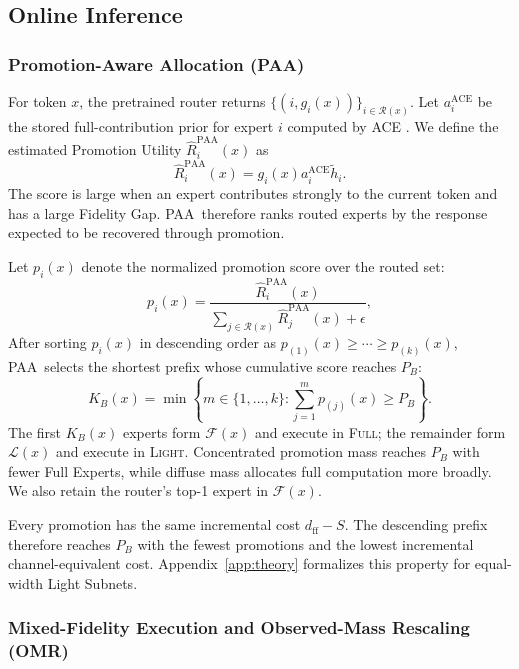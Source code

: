 \documentclass{article}
\newcommand{\Full}{\textsc{Full}}
\newcommand{\Light}{\textsc{Light}}
\newcommand{\PAA}{\textsc{PAA}}
\newcommand{\OMR}{\textsc{OMR}}
\newcommand{\Rset}{\mathcal{R}}
\newcommand{\Fset}{\mathcal{F}}
\newcommand{\Lset}{\mathcal{L}}
\begin{document}
\subsection{Online Inference}

\subsubsection{Promotion-Aware Allocation (\PAA)}

For token $x$, the pretrained router returns $\{(i,g_i(x))\}_{i\in\Rset(x)}$. Let $a_i^{\mathrm{ACE}}$ be the stored full-contribution prior for expert $i$ computed by ACE \citep{xu2026aceadaptivecalibrationfreeexpert}. We define the estimated Promotion Utility $\widehat R_i^{\mathrm{PAA}}(x)$ as
\begin{equation}
  \widehat R_i^{\mathrm{PAA}}(x)
  =g_i(x)a_i^{\mathrm{ACE}}\widetilde h_i.
  \label{eq:paa-utility}
\end{equation}
The score is large when an expert contributes strongly to the current token and has a large Fidelity Gap. \PAA\ therefore ranks routed experts by the response expected to be recovered through promotion.

Let $p_i(x)$ denote the normalized promotion score over the routed set:
\begin{equation}
  p_i(x)=\frac{\widehat R_i^{\mathrm{PAA}}(x)}
  {\sum_{j\in\Rset(x)}\widehat R_j^{\mathrm{PAA}}(x)+\epsilon},
  \label{eq:paa-score}
\end{equation}
After sorting $p_i(x)$ in descending order as $p_{(1)}(x)\geq\cdots\geq p_{(k)}(x)$, \PAA\ selects the shortest prefix whose cumulative score reaches $P_B$:
\begin{equation}
  K_B(x)=\min\left\{m\in\{1,\ldots,k\}:\sum_{j=1}^{m}p_{(j)}(x)\geq P_B\right\}.
  \label{eq:cumulative-top-p}
\end{equation}
The first $K_B(x)$ experts form $\Fset(x)$ and execute in \Full; the remainder form $\Lset(x)$ and execute in \Light. Concentrated promotion mass reaches $P_B$ with fewer Full Experts, while diffuse mass allocates full computation more broadly. We also retain the router's top-1 expert in $\Fset(x)$.

Every promotion has the same incremental cost $d_{\mathrm{ff}}-S$. The descending prefix therefore reaches $P_B$ with the fewest promotions and the lowest incremental channel-equivalent cost. Appendix~\ref{app:theory} formalizes this property for equal-width Light Subnets.

\subsubsection{Mixed-Fidelity Execution and Observed-Mass Rescaling (\OMR)}
\end{document}
